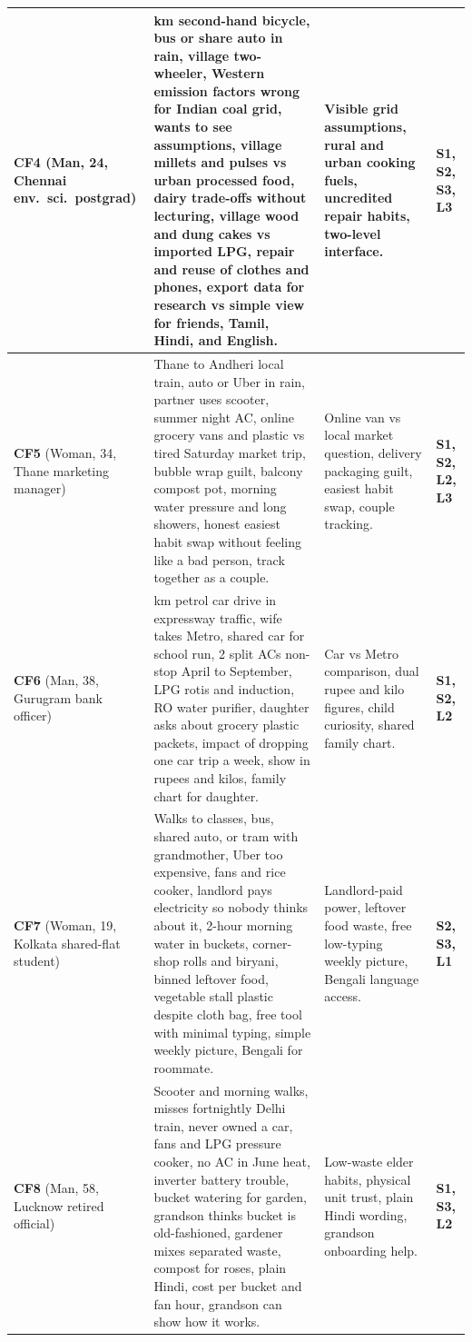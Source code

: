\documentclass[12pt, a4paper]{article}
\begin{document}
\begin{longtable}{|>{\raggedright\arraybackslash}p{3.0cm}|>{\raggedright\arraybackslash}p{7.1cm}|>{\raggedright\arraybackslash}p{3.7cm}|>{\raggedright\arraybackslash}p{1.9cm}|}
\textbf{CF4} \cite{cf4} (Man, 24, Chennai env.\ sci.\ postgrad) & 
6 km second-hand bicycle, bus or share auto in rain, village two-wheeler, Western emission factors wrong for Indian coal grid, wants to see assumptions, village millets and pulses vs urban processed food, dairy trade-offs without lecturing, village wood and dung cakes vs imported LPG, repair and reuse of clothes and phones, export data for research vs simple view for friends, Tamil, Hindi, and English. & 
Visible grid assumptions, rural and urban cooking fuels, uncredited repair habits, two-level interface. & 
\textbf{S1, S2, S3, L3} \\
\hline

\textbf{CF5} \cite{cf5} (Woman, 34, Thane marketing manager) & 
Thane to Andheri local train, auto or Uber in rain, partner uses scooter, summer night AC, online grocery vans and plastic vs tired Saturday market trip, bubble wrap guilt, balcony compost pot, morning water pressure and long showers, honest easiest habit swap without feeling like a bad person, track together as a couple. & 
Online van vs local market question, delivery packaging guilt, easiest habit swap, couple tracking. & 
\textbf{S1, S2, L2, L3} \\
\hline

\textbf{CF6} \cite{cf6} (Man, 38, Gurugram bank officer) & 
25 km petrol car drive in expressway traffic, wife takes Metro, shared car for school run, 2 split ACs non-stop April to September, LPG rotis and induction, RO water purifier, daughter asks about grocery plastic packets, impact of dropping one car trip a week, show in rupees and kilos, family chart for daughter. & 
Car vs Metro comparison, dual rupee and kilo figures, child curiosity, shared family chart. & 
\textbf{S1, S2, L2} \\
\hline

\textbf{CF7} \cite{cf7} (Woman, 19, Kolkata shared-flat student) & 
Walks to classes, bus, shared auto, or tram with grandmother, Uber too expensive, fans and rice cooker, landlord pays electricity so nobody thinks about it, 2-hour morning water in buckets, corner-shop rolls and biryani, binned leftover food, vegetable stall plastic despite cloth bag, free tool with minimal typing, simple weekly picture, Bengali for roommate. & 
Landlord-paid power, leftover food waste, free low-typing weekly picture, Bengali language access. & 
\textbf{S2, S3, L1} \\
\hline

\textbf{CF8} \cite{cf8} (Man, 58, Lucknow retired official) & 
Scooter and morning walks, misses fortnightly Delhi train, never owned a car, fans and LPG pressure cooker, no AC in June heat, inverter battery trouble, bucket watering for garden, grandson thinks bucket is old-fashioned, gardener mixes separated waste, compost for roses, plain Hindi, cost per bucket and fan hour, grandson can show how it works. & 
Low-waste elder habits, physical unit trust, plain Hindi wording, grandson onboarding help. & 
\textbf{S1, S3, L2} \\
\hline


\end{longtable}
\end{document}

